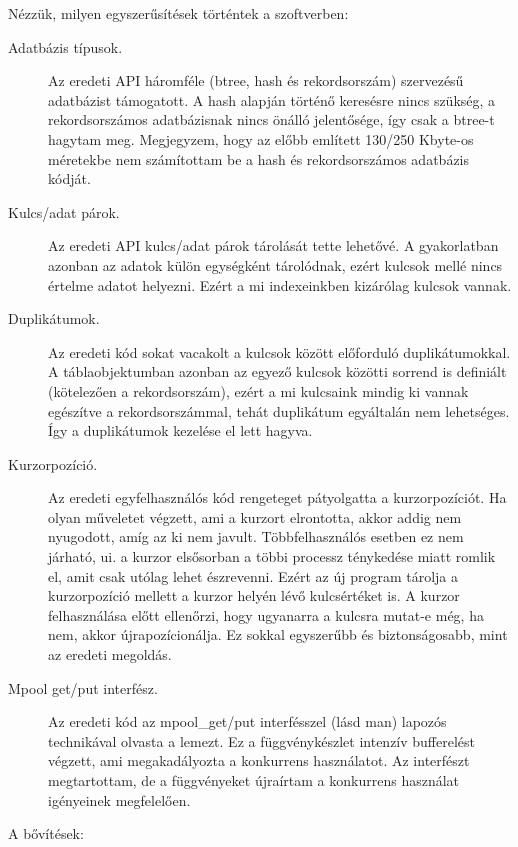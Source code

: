 Nézzük, milyen egyszerűsítések történtek a szoftverben:

\begin{description}
\item[Adatbázis típusok.]
  Az eredeti API háromféle (btree, hash és rekordsorszám) szervezésű
  adatbázist támogatott. A hash alapján történő keresésre nincs
  szükség, a rekordsorszámos adatbázisnak nincs önálló jelentősége,
  így csak a btree-t hagytam meg. Megjegyzem, hogy az előbb
  említett 130/250 Kbyte-os méretekbe nem számítottam be 
  a hash és rekordsorszámos adatbázis kódját. 
\item[Kulcs/adat párok.]
  Az eredeti API kulcs/adat párok tárolását tette lehetővé.
  A gyakorlatban azonban az adatok külön egységként tárolódnak,
  ezért kulcsok mellé nincs értelme adatot helyezni. 
  Ezért a mi indexeinkben kizárólag kulcsok vannak.
\item[Duplikátumok.]
  Az eredeti kód sokat vacakolt a kulcsok között előforduló
  duplikátumokkal. A táblaobjektumban azonban az egyező kulcsok
  közötti sorrend is definiált (kötelezően a rekordsorszám),
  ezért a mi kulcsaink mindig ki vannak egészítve a rekordsorszámmal,
  tehát duplikátum egyáltalán nem lehetséges. Így a duplikátumok
  kezelése el lett hagyva.
\item[Kurzorpozíció.]
  Az eredeti egyfelhasználós kód rengeteget pátyolgatta a kurzorpozíciót.
  Ha olyan műveletet végzett, ami a kurzort elrontotta, 
  akkor addig nem nyugodott, amíg az ki nem javult.
  Többfelhasználós esetben ez nem járható, ui. a kurzor
  elsősorban a többi processz ténykedése miatt romlik el,
  amit csak utólag lehet észrevenni. Ezért az új program
  tárolja a kurzorpozíció mellett a kurzor helyén lévő
  kulcsértéket is. A kurzor felhasználása előtt ellenőrzi, 
  hogy ugyanarra a kulcsra mutat-e még, ha nem, 
  akkor újrapozícionálja. Ez sokkal egyszerűbb és biztonságosabb,
  mint az eredeti megoldás.
\item[Mpool get/put interfész.]  
  Az eredeti kód az mpool\_get/put interfésszel (lásd man)
  lapozós technikával olvasta a lemezt. Ez a függvénykészlet
  intenzív bufferelést végzett, ami megakadályozta a konkurrens
  használatot. Az interfészt megtartottam, de a függvényeket
  újraírtam a konkurrens használat igényeinek megfelelően.
\end{description}
 
A bővítések:

